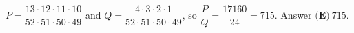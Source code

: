 $P=\dfrac{13\cdot12\cdot11\cdot10}{52\cdot51\cdot50\cdot49}$ and $Q=\dfrac{4\cdot3\cdot2\cdot1}{52\cdot51\cdot50\cdot49}$, so $\dfrac PQ=\dfrac{17160}{24}=715$. Answer $\boxed{\textbf{(E)}\ 715}$.

